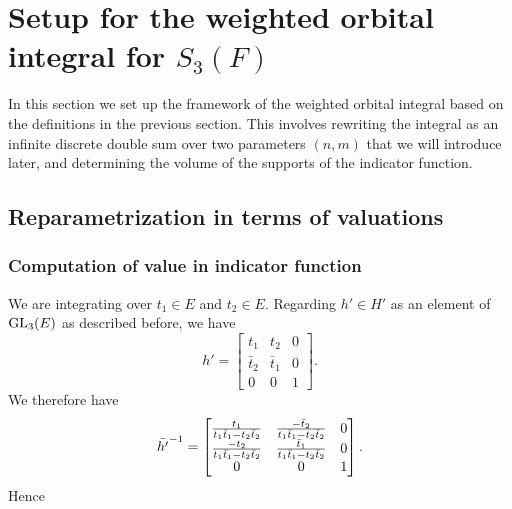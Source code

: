 \chapter{Setup for the weighted orbital integral for $S_3(F)$}
\label{ch:orbital1}

In this section we set up the framework of the weighted orbital integral
based on the definitions in the previous section.
This involves rewriting the integral as an infinite discrete double sum
over two parameters $(n,m)$ that we will introduce later,
and determining the volume of the supports of the indicator function.

\section{Reparametrization in terms of valuations}
\subsection{Computation of value in indicator function}
We are integrating over $t_1 \in E$ and $t_2 \in E$.
Regarding $h' \in H'$ as an element of $\operatorname{GL}_3(E)$ as described before, we have
\[ h' = \begin{bmatrix}
  t_1 & t_2 & 0  \\
  \bar t_2 & \bar t_1 & 0 \\
  0 & 0 & 1
  \end{bmatrix}. \]
We therefore have
\[ \bar{h'}^{-1} = \begin{bmatrix}
  \frac{t_1}{t_1 \bar t_1 - t_2 \bar t_2} & \frac{-\bar t_2}{t_1 \bar t_1 - t_2 \bar t_2} & 0 \\
  \frac{-t_2}{t_1 \bar t_1 - t_2 \bar t_2} & \frac{\bar t_1}{t_1 \bar t_1 - t_2 \bar t_2} & 0 \\
  0 & 0 & 1 \end{bmatrix}. \]
Hence
